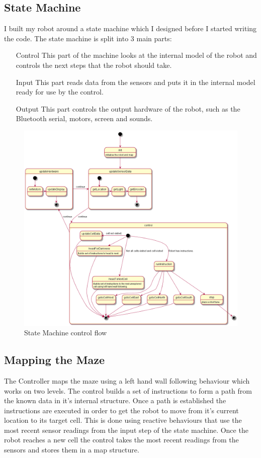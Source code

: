 \documentclass[11pt,a4paper,titlepage]{article}
\begin{document}
        \subsection{State Machine}
            I built my robot around a state machine which I designed before I started writing the code.
            The state machine is split into 3 main parts:
            \begin{itemize}
                \item[Control] This part of the machine looks at the internal model of the robot and controls the next steps that the robot should take.
                \item[Input] This part reads data from the sensors and puts it in the internal model ready for use by the control.
                \item[Output] This part controls the output hardware of the robot, such as the Bluetooth serial, motors, screen and sounds.
            \end{itemize} 
            \begin{figure}[H]
                \caption{State Machine control flow}
                \includegraphics[width=17cm,keepaspectratio]{stateDiagram}
            \end{figure}
        \subsection{Mapping the Maze}
            The Controller maps the maze using a left hand wall following behaviour which works on two levels. 
            The control builds a set of instructions to form a path from the known data in it's internal structure. 
            Once a path is established the instructions are executed in order to get the robot to move from it's current location to its target cell. 
            This is done using reactive behaviours that use the most recent sensor readings from the input step of the state machine.
            Once the robot reaches a new cell the control takes the most recent readings from the sensors and stores them in a map structure. 
\end{document}
